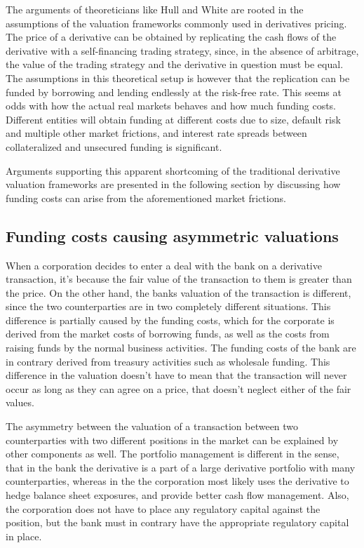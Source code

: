 \documentclass[../main.tex]{subfiles}
\begin{document}
        The arguments of theoreticians like Hull and White are rooted in the assumptions of the valuation frameworks commonly used in derivatives pricing.
        The price of a derivative can be obtained by replicating the cash flows of the derivative with a self-financing trading strategy, 
        since, in the absence of arbitrage, the value of the trading strategy and the derivative in question must be equal.
        The assumptions in this theoretical setup is however 
        that the replication can be funded by borrowing and lending endlessly at the risk-free rate.
        This seems at odds with how the actual real markets behaves and how much funding costs.
        Different entities will obtain funding at different costs due to size,
        default risk and multiple other market frictions,
        and interest rate spreads between collateralized and unsecured funding is significant.

        Arguments supporting this apparent shortcoming of the traditional derivative valuation frameworks are presented in the following section by discussing how funding costs can arise from the aforementioned market frictions.
    
    \subsection{Funding costs causing asymmetric valuations}
        When a corporation decides to enter a deal with the bank on a derivative transaction,
        it's because the fair value of the transaction to them is greater than the price.
        On the other hand, the banks valuation of the transaction is different,
        since the two counterparties are in two completely different situations.
        This difference is partially caused by the funding costs,
        which for the corporate is derived from the market costs of borrowing funds,
        as well as the costs from raising funds by the normal business activities.
        The funding costs of the bank are in contrary derived from treasury activities such as wholesale funding.
        This difference in the valuation doesn't have to mean that the transaction will never occur 
        as long as they can agree on a price, that doesn't neglect either of the fair values.

        The asymmetry between the valuation of a transaction between two counterparties with two different positions in the market can be explained by other components as well.
        The portfolio management is different in the sense,
        that in the bank the derivative is a part of a large derivative portfolio with many counterparties,
        whereas in the the corporation most likely uses the derivative to hedge balance sheet exposures,
        and provide better cash flow management.
        Also, the corporation does not have to place any regulatory capital against the position,
        but the bank must in contrary have the appropriate regulatory capital in place.
\end{document}
